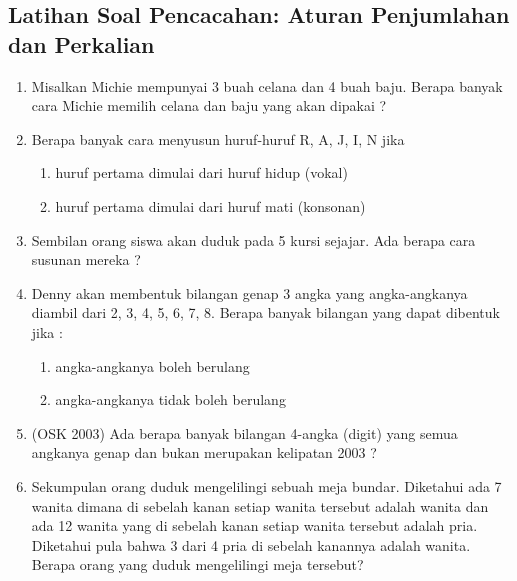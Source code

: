 \subsection{Latihan Soal Pencacahan: Aturan Penjumlahan dan Perkalian}
\begin{enumerate}
    \item Misalkan Michie mempunyai 3 buah celana dan 4 buah baju. Berapa banyak cara Michie memilih celana dan baju yang akan dipakai ?

    \item Berapa banyak cara menyusun huruf-huruf R, A, J, I, N jika 
    \begin{enumerate}
        \item huruf pertama dimulai dari huruf hidup (vokal) 
        \item huruf pertama dimulai dari huruf mati (konsonan) 
    \end{enumerate}

    \item Sembilan orang siswa akan duduk pada 5 kursi sejajar. Ada berapa cara susunan mereka ? 
    
    \item Denny akan membentuk bilangan genap 3 angka yang angka-angkanya diambil dari 2, 3, 4, 5, 6, 7, 8. Berapa banyak bilangan yang dapat dibentuk jika : 
    \begin{enumerate}
        \item angka-angkanya boleh berulang 
        \item angka-angkanya tidak boleh berulang
    \end{enumerate}

    \item (OSK 2003) Ada berapa banyak bilangan 4-angka (digit) yang semua angkanya genap dan bukan merupakan kelipatan 2003 ?

    \item Sekumpulan orang duduk mengelilingi sebuah meja bundar. Diketahui ada 7 wanita dimana di sebelah kanan setiap wanita tersebut adalah wanita dan ada 12 wanita yang di sebelah kanan setiap wanita tersebut adalah pria. Diketahui pula bahwa 3 dari 4 pria di sebelah kanannya adalah wanita. Berapa orang yang duduk mengelilingi meja tersebut?
\end{enumerate}